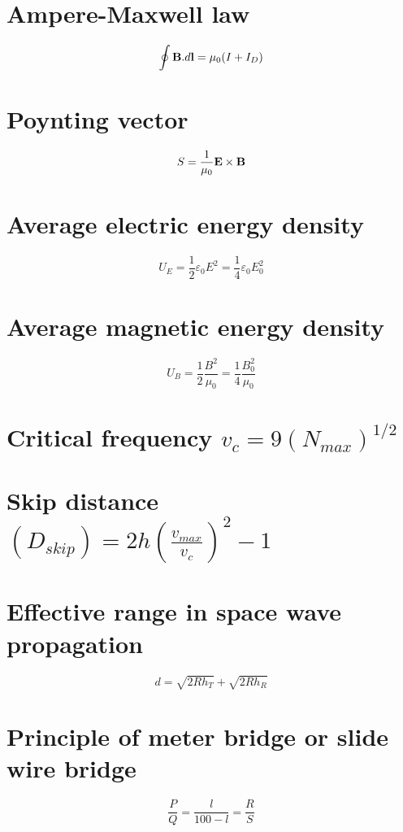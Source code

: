 \documentclass{article}
\begin{document}
\section{Ampere-Maxwell law  }
 $$\displaystyle {\oint {\bf B}.d{\bf l}}= \mu_0(I+I_D)$$
\section{Poynting vector  }
 $$\displaystyle S= \frac{1}{\mu_0}{{\bf E} \times {\bf B}}$$
\section{Average electric energy density  }
 $$\displaystyle U_E=\frac{1}{2}{\varepsilon}_0E^2=\frac{1}{4}\varepsilon_0E_0^2$$
\section{Average magnetic energy density}
 $$\displaystyle U_B=\frac{1}{2}\frac{B^2}{\mu_0}=\frac{1}{4}\frac{B_0^2}{\mu_0}$$ 
\section{Critical frequency $\displaystyle {v_c}=9(N_{max})^{1/2}$ }
\section{Skip distance $\displaystyle (D_{skip})=2h(\frac{v_{max}}{v_c})^2 -1$ }
\section{Effective range in space wave propagation }
 $$\displaystyle d=\sqrt{2Rh_T}+\sqrt{2Rh_R}$$
\section{Principle of meter bridge or slide wire bridge }
 $$\displaystyle \frac{P}{Q}=\frac{l}{100-l}=\frac{R}{S}$$ 
\end{document}
